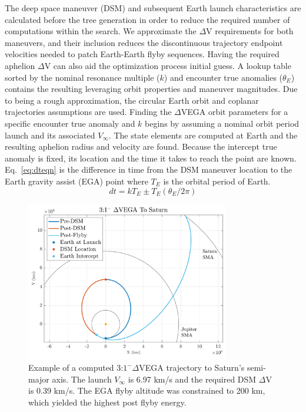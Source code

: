\documentclass[letterpaper, preprint, paper,11pt]{AAS}	%
\begin{document}
The deep space maneuver (DSM) and subsequent Earth launch characteristics are calculated before the tree generation in order to reduce the required number of computations within the search. We approximate the $\Delta$V requirements for both maneuvers, and their inclusion reduces the discontinuous trajectory endpoint velocities needed to patch Earth-Earth flyby sequences. Having the required aphelion $\Delta$V can also aid the optimization process initial guess. A lookup table sorted by the nominal resonance multiple ($k$) and encounter true anomalies ($\theta_{E}$) contains the resulting leveraging orbit properties and maneuver magnitudes. Due to being a rough approximation, the circular Earth orbit and coplanar trajectories assumptions are used. Finding the $\Delta$VEGA orbit parameters for a specific encounter true anomaly and $k$ begins by assuming a nominal orbit period launch and its associated $V_\infty$. The state elements are computed at Earth and the resulting aphelion radius and velocity are found. Because the intercept true anomaly is fixed, its location and the time it takes to reach the point are known. Eq.~\eqref{eq:dteqn} is the difference in time from the DSM maneuver location to the Earth gravity assist (EGA) point where $T_E$ is the orbital period of Earth.
%
\begin{equation}
	\label{eq:dteqn}
	dt = kT_E \pm T_E(\theta_E/2\pi)
\end{equation}
%
%
\begin{figure}[htb]
	\centering\includegraphics[width=3.5in]{./fig/dsmmatlab}
	\caption{Example of a computed 3:$1^{-} \Delta$VEGA trajectory to Saturn's semi-major axis. The launch $V_\infty$ is 6.97 km/s and the required DSM $\Delta$V is 0.39 km/s. The EGA flyby altitude was constrained to 200 km, which yielded the highest post flyby energy.}
	\label{fig:dsmmatlab}
\end{figure}
\end{document}
